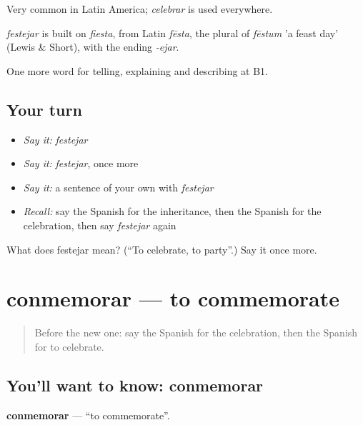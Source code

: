 Very common in Latin America; \emph{celebrar} is used everywhere.

\begin{cousinweb}
\emph{festejar} is built on \emph{fiesta}, from Latin \emph{fēsta}, the plural of \emph{fēstum} 'a feast day' (Lewis \& Short), with the ending \emph{-ejar}.
\end{cousinweb}

\begin{grammarlens}[title={What you've built}]
One more word for telling, explaining and describing at B1.
\end{grammarlens}

\subsection*{Your turn}
\begin{itemize}
\raggedright
  \item \emph{Say it:} \emph{festejar}
  \item \emph{Say it:} \emph{festejar}, once more
  \item \emph{Say it:} a sentence of your own with \emph{festejar}
  \item \emph{Recall:} say the Spanish for the inheritance, then the Spanish for the celebration, then say \emph{festejar} again
\end{itemize}

\begin{tcolorbox}[breakable,colback=teal!4,colframe=teal!35!black,title={Before you move on}]
What does festejar mean? (\textquotedblleft{}To celebrate, to party\textquotedblright{}.) Say it once more.
\end{tcolorbox}
\section[conmemorar]{conmemorar — to commemorate}

\label{lesson:ES-C558-conmemorar}



\begin{quote}
Before the new one: say the Spanish for the celebration, then the Spanish for to celebrate.
\end{quote}

\subsection*{You'll want to know: conmemorar}
\textbf{conmemorar} — \textquotedblleft{}to commemorate\textquotedblright{}.

